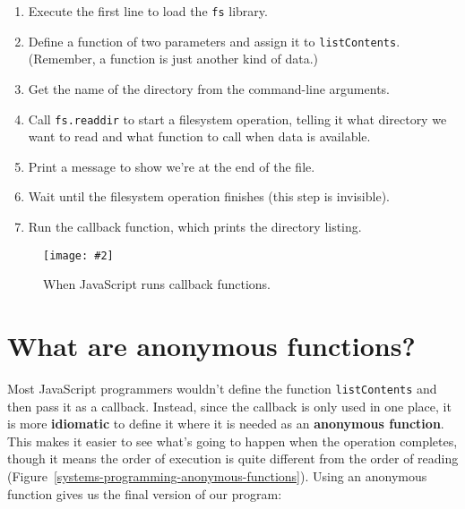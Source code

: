 \documentclass[krantzl]{krantz}
\newcommand{\figpdf}[4]{\begin{figure}%
\centering%
\texttt{[image: \#2]}%
\caption{#3}%
\label{#1}%
\end{figure}}
\newcommand{\figref}[1]{Figure~\ref{#1}}
\newcommand{\glossref}[1]{\textbf{#1}}
\begin{document}
\begin{enumerate}

\item 

Execute the first line to load the \texttt{fs} library.



\item 

Define a function of two parameters and assign it to \texttt{listContents}.
    (Remember, a function is just another kind of data.)



\item 

Get the name of the directory from the command-line arguments.



\item 

Call \texttt{fs.readdir} to start a filesystem operation,
    telling it what directory we want to read and what function to call when data is available.



\item 

Print a message to show we're at the end of the file.



\item 

Wait until the filesystem operation finishes (this step is invisible).



\item 

Run the callback function, which prints the directory listing.



\end{enumerate}

\figpdf{systems-programming-execution-order}{./systems-programming/execution-order.pdf}{When JavaScript runs callback functions.}{0.6}

\section{What are anonymous functions?}\label{systems-programming-anonymous}


Most JavaScript programmers wouldn't define the function \texttt{listContents}
and then pass it as a callback.
Instead,
since the callback is only used in one place,
it is more \glossref{idiomatic}
to define it where it is needed
as an \glossref{anonymous function}.
This makes it easier to see what's going to happen when the operation completes,
though it means the order of execution is quite different from the order of reading
(\figref{systems-programming-anonymous-functions}).
Using an anonymous function gives us the final version of our program:
\end{document}

